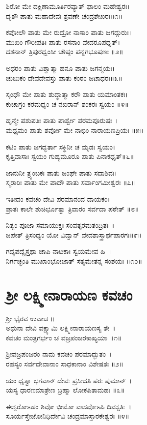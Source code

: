 ಶಿರೋ ಮೇ ದಕ್ಷಿಣಾಮೂರ್ತಿರವ್ಯಾತ್ ಫಾಲಂ ಮಹೇಶ್ವರಃ।\\
ದೃಶೌ ಪಾತು ಮಹಾದೇವಃ ಶ್ರವಣೇ ಚಂದ್ರಶೇಖರಃ॥೧॥

ಕಪೋಲೌ ಪಾತು ಮೇ ರುದ್ರೋ ನಾಸಾಂ ಪಾತು ಜಗದ್ಗುರುಃ।\\
ಮುಖಂ ಗೌರೀಪತಿಃ ಪಾತು ರಸನಾಂ ವೇದರೂಪಧೃತ್।\\
ದಶನಾನ್ ತ್ರಿಪುರಧ್ವಂಸೀ ಚೌಷ್ಠಂ ಪನ್ನಗಭೂಷಣಃ ॥೨॥

ಅಧರಂ ಪಾತು ವಿಶ್ವಾತ್ಮಾ ಹನೂ ಪಾತು ಜಗನ್ಮಯಃ।\\
ಚುಬುಕಂ ದೇವದೇವಸ್ತು ಪಾತು ಕಂಠಂ ಜಟಾಧರಃ॥೩॥

ಸ್ಕಂಧೌ ಮೇ ಪಾತು ಶುದ್ಧಾತ್ಮಾ ಕರೌ ಪಾತು ಯಮಾಂತಕಃ।\\
ಕುಚಾಗ್ರಂ ಕರಮಧ್ಯಂ ಚ ನಖರಾನ್ ಶಂಕರಃ ಸ್ವಯಂ ॥೪॥

ಹೃನ್ಮೇ ಪಶುಪತಿಃ ಪಾತು ಪಾರ್ಶ್ವೇ ಪರಮಪೂರುಷಃ~।\\
ಮಧ್ಯಮಂ ಪಾತು ಶರ್ವೋ ಮೇ ನಾಭಿಂ ನಾರಾಯಣಪ್ರಿಯಃ ॥೫॥

ಕಟಿಂ ಪಾತು ಜಗದ್ಭರ್ತಾ ಸಕ್ಥಿನೀ ಚ ಮೃಡಃ ಸ್ವಯಂ।\\
ಕೃತ್ತಿವಾಸಾಃ ಸ್ವಯಂ ಗುಹ್ಯಮೂರೂ ಪಾತು ಪಿನಾಕಧೃತ್॥೬॥

ಜಾನುನೀ ತ್ರ್ಯಂಬಕಃ ಪಾತು ಜಂಘೇ ಪಾತು ಸದಾಶಿವಃ।\\
ಸ್ಮರಾರಿಃ ಪಾತು ಮೇ ಪಾದೌ ಪಾತು ಸರ್ವಾಂಗಮೀಶ್ವರಃ ॥೭॥

ಇತೀದಂ ಕವಚಂ ದೇವಿ ಪರಮಾನಂದ ದಾಯಕಂ।\\
ಪ್ರಾತಃ ಕಾಲೇ ಶುಚಿರ್ಭೂತ್ವಾ ತ್ರಿವಾರಂ ಸರ್ವದಾ ಪಠೇತ್ ॥೮॥

ನಿತ್ಯಂ ಪೂಜಾ ಸಮಾಯುಕ್ತಃ ಸಂವತ್ಸರಮತಂದ್ರಿತಃ~।\\
ಜಪೇತ್ ತ್ರಿಸಂಧ್ಯಂ ಯೋ ವಿದ್ವಾನ್ ವೇದಶಾಸ್ತ್ರಾರ್ಥಪಾರಗಃ॥೯॥

ಗದ್ಯಪದ್ಯೈಸ್ತಥಾ ಚಾಪಿ ನಾಟಕಾಃ ಸ್ವಯಮೇವ ಹಿ~।\\
ನಿರ್ಗಚ್ಛಂತಿ ಮುಖಾಂಭೋಜಾತ್ ಸತ್ಯಮೇತನ್ನ ಸಂಶಯಃ ॥೧೦॥
\section{ಶ್ರೀ ಲಕ್ಷ್ಮೀನಾರಾಯಣ ಕವಚಂ }
ಶ್ರೀ ಭೈರವ ಉವಾಚ ॥\\
ಅಧುನಾ ದೇವಿ ವಕ್ಷ್ಯಾಮಿ ಲಕ್ಷ್ಮೀನಾರಾಯಣಸ್ಯ ತೇ~।\\
ಕವಚಂ ಮಂತ್ರಗರ್ಭಂ ಚ ವಜ್ರಪಂಜರಕಾಖ್ಯಯಾ ॥೧॥

ಶ್ರೀವಜ್ರಪಂಜರಂ ನಾಮ ಕವಚಂ ಪರಮಾದ್ಭುತಂ~।\\
ರಹಸ್ಯಂ ಸರ್ವದೇವಾನಾಂ ಸಾಧಕಾನಾಂ ವಿಶೇಷತಃ ॥೨॥

ಯಂ ಧೃತ್ವಾ ಭಗವಾನ್ ದೇವಃ ಪ್ರಸೀದತಿ ಪರಃ ಪುಮಾನ್~।\\
ಯಸ್ಯ ಧಾರಣಮಾತ್ರೇಣ ಬ್ರಹ್ಮಾ ಲೋಕಪಿತಾಮಹಃ ॥೩॥

ಈಶ್ವರೋಽಹಂ ಶಿವೋ ಭೀಮೋ ವಾಸವೋಽಪಿ ದಿವಸ್ಪತಿಃ~।\\
ಸೂರ್ಯಸ್ತೇಜೋನಿಧಿರ್ದೇವಿ ಚಂದ್ರಮಾಸ್ತಾರಕೇಶ್ವರಃ ॥೪॥

